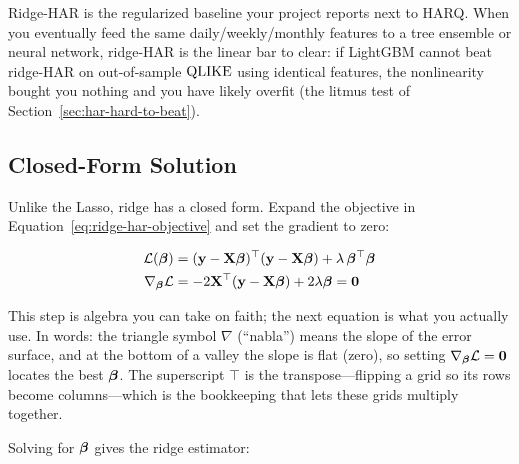 \begin{projectconnection}
Ridge-HAR is the regularized baseline your project reports next to HARQ.
When you eventually feed the same daily/weekly/monthly features to a tree ensemble or neural network, ridge-HAR is the linear bar to clear: if LightGBM cannot beat ridge-HAR on out-of-sample $\operatorname{QLIKE}$ using identical features, the nonlinearity bought you nothing and you have likely overfit (the litmus test of Section~\ref{sec:har-hard-to-beat}).
\end{projectconnection}

\subsection{Closed-Form Solution}

Unlike the Lasso, ridge has a closed form.
Expand the objective in Equation~\eqref{eq:ridge-har-objective} and set the gradient to zero:

\begin{align}
  \mathcal{L}(\bm{\beta}) &= (\mathbf{y} - \mathbf{X}\bm{\beta})^\top(\mathbf{y} - \mathbf{X}\bm{\beta}) + \lambda\,\bm{\beta}^\top\bm{\beta} \notag \\
  \nabla_{\bm{\beta}}\mathcal{L} &= -2\mathbf{X}^\top(\mathbf{y} - \mathbf{X}\bm{\beta}) + 2\lambda\bm{\beta} = \mathbf{0}
  \label{eq:ridge-har-gradient}
\end{align}

This step is algebra you can take on faith; the next equation is what you actually use.
In words: the triangle symbol $\nabla$ (``nabla'') means the slope of the error surface, and at the bottom of a valley the slope is flat (zero), so setting $\nabla_{\bm{\beta}}\mathcal{L} = \mathbf{0}$ locates the best $\bm{\beta}$.
The superscript $\top$ is the transpose---flipping a grid so its rows become columns---which is the bookkeeping that lets these grids multiply together.

Solving for $\bm{\beta}$ gives the ridge estimator:


